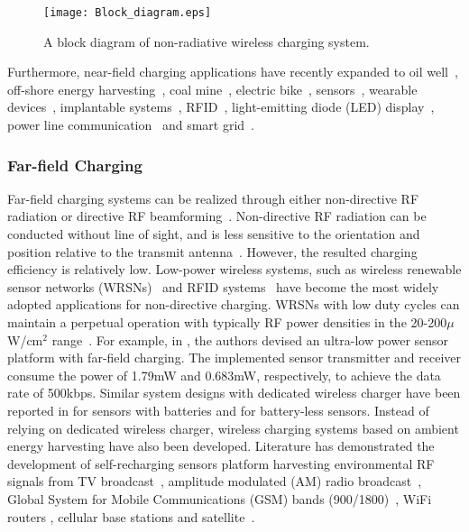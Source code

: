 \documentclass[twocolumn,10pt]{IEEEtran}
\begin{document}
\begin{figure*} 
\centering
\texttt{[image: Block\_diagram.eps]}
\caption{A block diagram of non-radiative wireless charging system.} \label{Block_diagram}
\end{figure*} 
 

Furthermore, near-field charging applications have recently expanded to oil well~\cite{X.2013Xin}, off-shore energy harvesting~\cite{Van2009Neste}, coal mine~\cite{Y.2011Zhou}, electric bike~\cite{F.2013Pellitteri}, sensors~\cite{K.2006Fotopoulou}, wearable devices~\cite{O.2013Jonah,N.2014Dobrostomat}, implantable systems~\cite{S.2013Ho,F.2009Zhang}, RFID~\cite{O.2014Mourad}, light-emitting diode (LED) display~\cite{I.2011Cho}, power line communication~\cite{S.2014Barmada} and smart grid~\cite{A.2014Kukde}.

\subsubsection{Far-field Charging}
 

Far-field charging systems can be realized through either non-directive RF radiation or directive RF beamforming~\cite{J.2013Visser}. 
Non-directive RF radiation can be conducted without line of sight, and is less sensitive to the orientation and position relative to the transmit antenna~\cite{E.2011Falkenstein}. However, the resulted charging efficiency is relatively low. 
Low-power wireless systems, such as wireless renewable sensor networks (WRSNs)~\cite{E.2011Falkenstein}  and RFID systems~\cite{A.2008Sample} have become the most widely adopted applications for non-directive charging. WRSNs with low duty cycles can maintain a perpetual operation with typically RF power densities in the 20-200$\mu$W/cm$^{2}$ range~\cite{Z.2013Popovic}. For example, in \cite{J.2012Hong}, the authors devised an ultra-low power sensor platform with far-field charging. The implemented sensor transmitter and receiver consume the power of 1.79mW and 0.683mW, respectively, to achieve the data rate of 500kbps. Similar system designs with dedicated wireless charger have been reported in \cite{D.2009Mascarenas,S.2014Percy,C.2014Cato} for sensors with batteries and \cite{N.Shinohara2014,L.2014Xia} for battery-less sensors. Instead of relying on dedicated wireless charger, wireless charging systems based on ambient energy harvesting have also been developed. Literature has demonstrated the development of self-recharging sensors platform harvesting environmental RF signals from TV broadcast~\cite{H.2010Nishimoto,P.2013Nintanavongsa,S.2014Kim,R.2013Vyas}, amplitude modulated (AM) radio broadcast~\cite{X2013Wang}, Global System for Mobile Communications (GSM) bands (900/1800)~\cite{B.2013Lim,M.2014Borges}, WiFi routers \cite{Abd2014Kadir,F.2014Alneyadi}, cellular base stations \cite{N.2013Parks} and satellite~\cite{2013A.Takacs,A.2013Takacs,A.Takacs2013}. 
\end{document}
